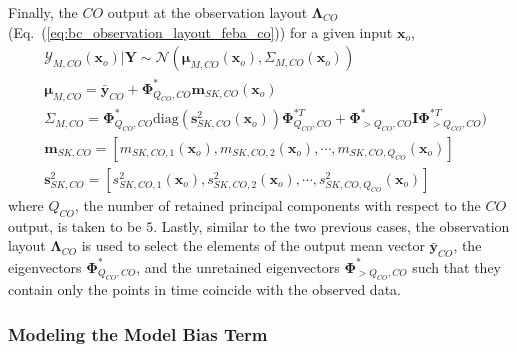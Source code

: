 Finally, the $CO$ output at the observation layout $\boldsymbol{\Lambda}_{CO}$ (Eq.~(\ref{eq:bc_observation_layout_feba_co})) for a given input $\bm{x}_o$,
\begin{equation}
	\begin{split}
		& \bm{\mathcal{Y}}_{M,CO} (\bm{x}_o) | \mathbf{Y} \sim \mathcal{N} (\boldsymbol{\mu}_{M,CO} (\bm{x}_o), \Sigma_{M,CO} (\bm{x}_o)) \\
		& \boldsymbol{\mu}_{M,CO}  = \bar{\mathbf{y}}_{CO} + \boldsymbol{\Phi}^*_{Q_{CO},CO} \mathbf{m}_{SK,CO}(\bm{x}_o) \\
		& \Sigma_{M,CO} = \boldsymbol{\Phi}^*_{Q_{CO},CO} \text{diag}(\mathbf{s}^2_{SK,CO}(\bm{x}_o)) \boldsymbol{\Phi}^{*T}_{Q_{CO},CO} + \boldsymbol{\Phi}^*_{>Q_{CO},CO} \mathbf{I}\boldsymbol{\Phi}^{*T}_{>Q_{CO},CO}) \\
		& \mathbf{m}_{SK,CO} = [m_{SK,CO,1}(\bm{x}_o), m_{SK,CO,2}(\bm{x}_o), \cdots, m_{SK,CO,Q_{CO}}(\bm{x}_o)] \\
		& \mathbf{s}^2_{SK,CO} = [s^2_{SK,CO,1}(\bm{x}_o), s^2_{SK,CO,2}(\bm{x}_o), \cdots, s^2_{SK,CO,Q_{CO}}(\bm{x}_o)]
	\end{split}
\label{eq:p_variate_metamodel_co}
\end{equation}
where $Q_{CO}$, the number of retained principal components with respect to the $CO$ output, is taken to be $5$.
Lastly, similar to the two previous cases, the observation layout $\boldsymbol{\Lambda}_{CO}$ is used to select the elements of the output mean vector $\bar{\mathbf{y}}_{CO}$, the eigenvectors $\boldsymbol{\Phi}^*_{Q_{CO},CO}$, and the unretained eigenvectors $\boldsymbol{\Phi}^*_{>Q_{CO},CO}$ such that they contain only the points in time coincide with the observed data.

\subsubsection{Modeling the Model Bias Term}\label{subsub:bc_model_bias}

